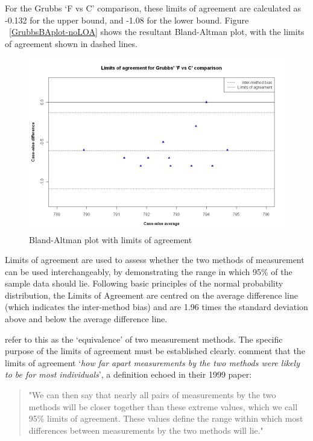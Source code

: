 \documentclass[12pt, a4paper]{report}
\theoremstyle{plain}
\theoremstyle{definition}
\theoremstyle{remark}
\begin{document}
For the Grubbs `F vs C' comparison, these limits
of agreement are calculated as -0.132 for the upper bound, and
-1.08 for the lower bound. Figure ~\ref{GrubbsBAplot-noLOA} shows the resultant
Bland-Altman plot, with the limits of agreement shown in dashed
lines.


\begin{figure}[h!]
	\begin{center}
		\includegraphics[width=125mm]{images/GrubbsBAplot-LOA.jpeg}
		\caption{Bland-Altman plot with limits of agreement}
	\end{center}
\end{figure}

Limits of agreement are used to assess whether the two methods of
measurement can be used interchangeably, by demonstrating the range in which 95\% of the sample data should lie. Following basic principles of the normal probability distribution, the Limits of Agreement are centred on the average difference line (which indicates the inter-method bias) and are 1.96 times the standard deviation
above and below the average difference line.

\citet{BA86} refer to
this as the `equivalence' of two measurement methods. The specific purpose of the limits of
agreement must be
established clearly. \citet*{BA95} comment that the limits of agreement `\textit{how
	far apart measurements by the two methods were likely to be for
	most individuals}', a definition echoed in their 1999 paper:

\begin{quote}"We can then say that nearly all pairs
	of measurements by the two methods will be closer together than
	these extreme values, which we call 95\% limits of agreement.
	These values define the range within which most differences
	between measurements by the two methods will lie."
\end{quote}
\end{document}
